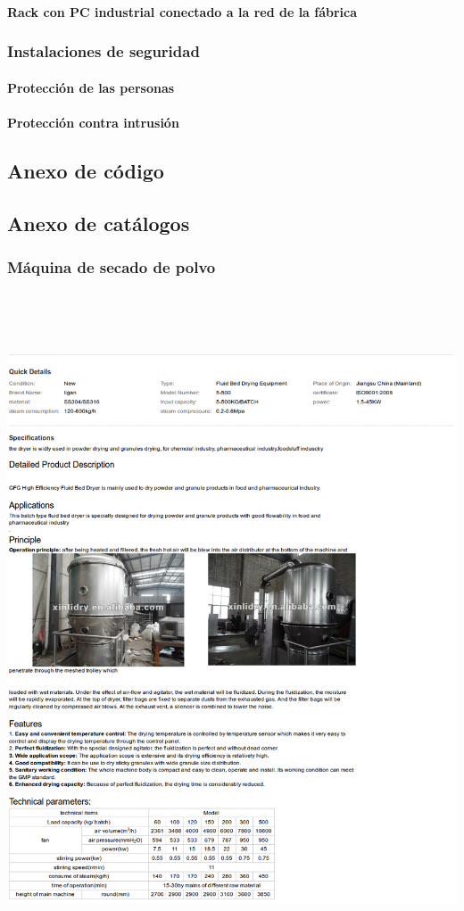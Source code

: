 \paragraph{Rack con PC industrial conectado a la red de la fábrica}
\subsubsection{Instalaciones de seguridad}
\paragraph{Protección de las personas}
\paragraph{Protección contra intrusión}

\subsection{Anexo de código}
\newpage
\subsection{Anexo de catálogos}
\subsubsection{Máquina de secado de polvo}
\includegraphics[width=15cm,height=20cm,keepaspectratio]{Datasheets/1MaquinaSecado.png} 
\newpage

